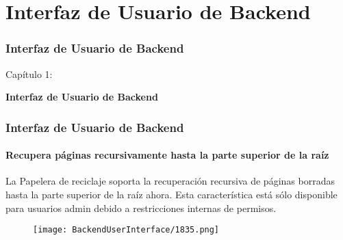 %

\section{Interfaz de Usuario de Backend}
\begin{frame}[fragile]
	\frametitle{Interfaz de Usuario de Backend}

	\begin{center}\huge{Capítulo 1:}\end{center}
	\begin{center}\huge{\color{typo3darkgrey}\textbf{Interfaz de Usuario de Backend}}\end{center}

\end{frame}

\begin{frame}[fragile]
	\frametitle{Interfaz de Usuario de Backend}
	\framesubtitle{Recupera páginas recursivamente hasta la parte superior de la raíz}

	La Papelera de reciclaje soporta la recuperación recursiva de páginas borradas hasta la parte superior de la raíz ahora.
	Esta característica está sólo disponible para usuarios admin debido a restricciones internas de permisos.

	\begin{figure}
		\texttt{[image: BackendUserInterface/1835.png]}
	\end{figure}

\end{frame}

